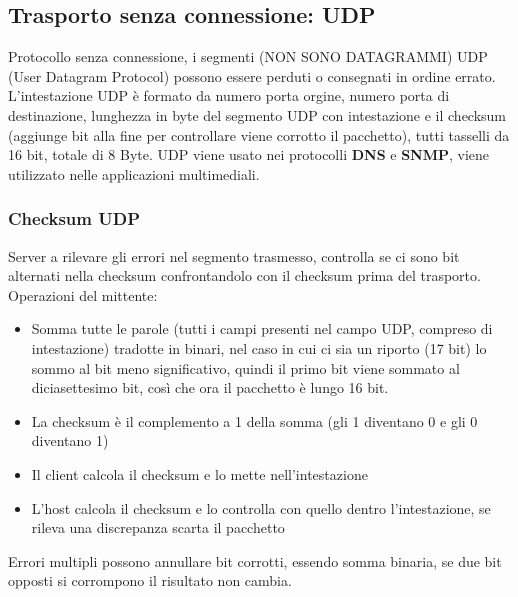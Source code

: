 \subsection{Trasporto senza connessione: UDP}
Protocollo senza connessione, i segmenti (NON SONO DATAGRAMMI) UDP (User Datagram Protocol) possono essere perduti o consegnati in ordine errato. 
L'intestazione UDP è formato da numero porta orgine, numero porta di destinazione, lunghezza in byte del segmento UDP con intestazione e il checksum (aggiunge bit alla fine per controllare viene corrotto il pacchetto), tutti tasselli da 16 bit, totale di 8 Byte. 
UDP viene usato nei protocolli \textbf{DNS} e \textbf{SNMP}, viene utilizzato nelle applicazioni multimediali.

\subsubsection*{Checksum UDP}
Server a rilevare gli errori nel segmento trasmesso, controlla se ci sono bit alternati nella checksum confrontandolo con il checksum prima del trasporto. \newline
Operazioni del mittente:
\begin{itemize}
  \item Somma tutte le parole (tutti i campi presenti nel campo UDP, compreso di intestazione) tradotte in binari, nel caso in cui ci sia un riporto (17 bit) lo sommo al bit meno significativo, quindi il primo bit viene sommato al diciasettesimo bit, così che ora il pacchetto è lungo 16 bit. 
  \item La checksum è il complemento a 1 della somma (gli 1 diventano 0 e gli 0 diventano 1)
  \item Il client calcola il checksum e lo mette nell'intestazione
  \item L'host calcola il checksum e lo controlla con quello dentro l'intestazione, se rileva una discrepanza scarta il pacchetto
\end{itemize}
Errori multipli possono annullare bit corrotti, essendo somma binaria, se due bit opposti si corrompono il risultato non cambia.

